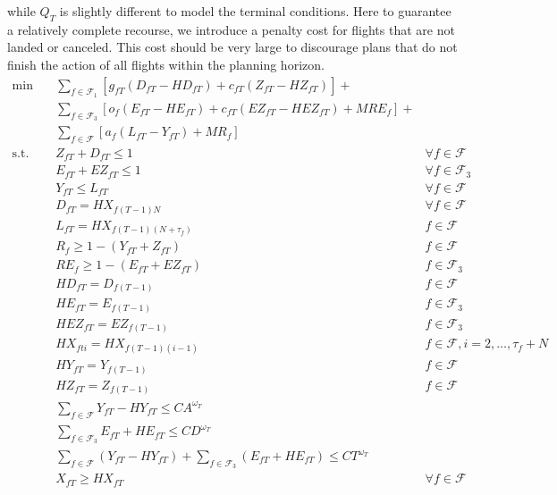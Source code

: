 \documentclass[12pt]{article}
\begin{document}
	while \(Q_T\) is slightly different to model the terminal conditions. Here to guarantee a relatively complete recourse, we introduce a penalty cost for flights that are not landed or canceled. This cost should be very large to discourage plans that do not finish the action of all flights within the planning horizon.
	\begin{subequations}
		\begin{align}
		\min \quad & \sum_{f \in \mathcal{F}_1} \left[ g_{fT} (D_{fT} - HD_{fT}) + c_{fT} (Z_{fT} - HZ_{fT}) \right] + & \nonumber \\
		& \sum_{f \in \mathcal{F}_3} \left[ o_f(E_{fT} - HE_{fT}) + c_{fT}(EZ_{fT} - HEZ_{fT}) + M RE_{f} \right] + & \nonumber\\ 
		& \sum_{f \in \mathcal{F}} \left[ a_f (L_{fT} - Y_{fT}) + M R_{f}\right]  &\\
		\text{s.t.} \quad & Z_{fT} + D_{fT} \leq 1 & \forall f \in \mathcal{F}\\
		& E_{fT} + EZ_{fT} \leq 1 & \forall f \in \mathcal{F}_3\\
		& Y_{fT} \leq L_{fT} & \forall f \in \mathcal{F}\\
		& D_{fT} = HX_{f(T-1)N} & \forall f \in \mathcal{F}\\
		& L_{fT} = HX_{f(T-1)(N+\tau_{f})}& f \in \mathcal{F}\\
		& R_f \geq 1 - (Y_{fT} + Z_{fT}) & f \in \mathcal{F}\\
		& RE_f \geq 1 - (E_{fT} + EZ_{fT}) & f \in \mathcal{F}_3\\
		& HD_{fT} = D_{f(T-1)} & f \in \mathcal{F}\\
		& HE_{fT} = E_{f(T-1)} & f \in \mathcal{F}_3\\
		& HEZ_{fT} = EZ_{f(T-1)} & f \in \mathcal{F}_3\\
		& HX_{fti} = HX_{f(T-1)(i-1)} & f \in \mathcal{F}, i = 2, \dots, \tau_{f} + N\\
		& HY_{fT} = Y_{f(T-1)} & f \in \mathcal{F}\\
		& HZ_{fT} = Z_{f(T-1)} & f \in \mathcal{F}\\
		& \sum_{f \in \mathcal{F}} Y_{fT} - HY_{fT} \leq CA^{\omega_T} &\\
		& \sum_{f \in \mathcal{F}_3} E_{fT} + HE_{fT} \leq CD^{\omega_T} &\\
		& \sum_{f \in \mathcal{F}} (Y_{fT} - HY_{fT}) + \sum_{f \in \mathcal{F}_3} (E_{fT} + HE_{fT}) \leq CT^{\omega_T} &\\
		& X_{fT} \geq HX_{fT} & \forall f \in \mathcal{F}\\

\end{align}
\end{subequations}
\end{document}
